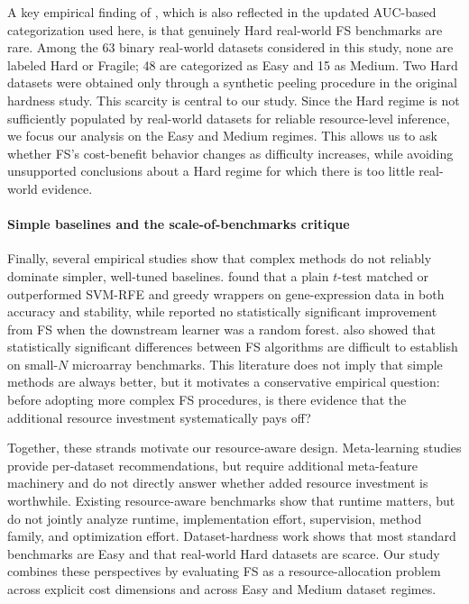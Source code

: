 \documentclass[preprint,12pt,authoryear]{elsarticle}
\begin{document}
{A key empirical finding of \citet{elmakias2025choosing}, which is also reflected in the updated AUC-based categorization used here, is that genuinely Hard real-world FS benchmarks are rare. Among the 63 binary real-world datasets considered in this study, none are labeled Hard or Fragile; 48 are categorized as Easy and 15 as Medium. Two Hard datasets were obtained only through a synthetic peeling procedure in the original hardness study. This scarcity is central to our study. Since the Hard regime is not sufficiently populated by real-world datasets for reliable resource-level inference, we focus our analysis on the Easy and Medium regimes. This allows us to ask whether FS's cost-benefit behavior changes as difficulty increases, while avoiding unsupported conclusions about a Hard regime for which there is too little real-world evidence.

\paragraph{Simple baselines and the scale-of-benchmarks critique}
Finally, several empirical studies show that complex methods do not reliably dominate simpler, well-tuned baselines. \citet{haury2011influence} found that a plain $t$-test matched or outperformed SVM-RFE and greedy wrappers on gene-expression data in both accuracy and stability, while \citet{eklund2014choosing} reported no statistically significant improvement from FS when the downstream learner was a random forest. \citet{BolonCanedo2014ReviewMicroarrayFS} also showed that statistically significant differences between FS algorithms are difficult to establish on small-$N$ microarray benchmarks. This literature does not imply that simple methods are always better, but it motivates a conservative empirical question: before adopting more complex FS procedures, is there evidence that the additional resource investment systematically pays off?

Together, these strands motivate our resource-aware design. Meta-learning studies provide per-dataset recommendations, but require additional meta-feature machinery and do not directly answer whether added resource investment is worthwhile. Existing resource-aware benchmarks show that runtime matters, but do not jointly analyze runtime, implementation effort, supervision, method family, and optimization effort. Dataset-hardness work shows that most standard benchmarks are Easy and that real-world Hard datasets are scarce. Our study combines these perspectives by evaluating FS as a resource-allocation problem across explicit cost dimensions and across Easy and Medium dataset regimes.

}
\end{document}

